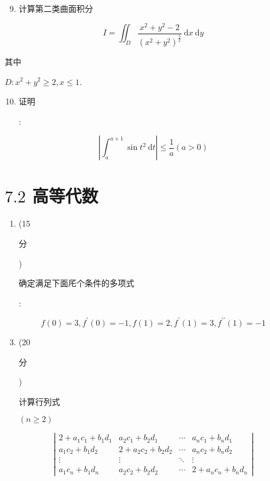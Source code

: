 \documentclass[10pt]{article}
\begin{document}
\begin{enumerate}
  \setcounter{enumi}{8}
  \item \begin{CJK}{UTF8}{mj}计算第二类曲面积分\end{CJK}
\end{enumerate}
$$
I=\iint_{D} \frac{x^{2}+y^{2}-2}{\left(x^{2}+y^{2}\right)^{\frac{5}{2}}} \mathrm{~d} x \mathrm{~d} y
$$
\begin{CJK}{UTF8}{mj}其中\end{CJK} $D: x^{2}+y^{2} \geq 2, x \leq 1$.

\begin{enumerate}
  \setcounter{enumi}{9}
  \item \begin{CJK}{UTF8}{mj}证明\end{CJK}:
\end{enumerate}
$$
\left|\int_{a}^{a+1} \sin t^{2} \mathrm{~d} t\right| \leq \frac{1}{a}(a>0)
$$

\section{$7.2$ 高等代数}
\begin{enumerate}
  \item (15 \begin{CJK}{UTF8}{mj}分\end{CJK}) \begin{CJK}{UTF8}{mj}确定满足下面厇个条件的多项式\end{CJK}:
\end{enumerate}
$$
f(0)=3, f^{\prime}(0)=-1, f(1)=2, f^{\prime}(1)=3, f^{\prime \prime}(1)=-1
$$

\begin{enumerate}
  \setcounter{enumi}{2}
  \item (20 \begin{CJK}{UTF8}{mj}分\end{CJK}) \begin{CJK}{UTF8}{mj}计算行列式\end{CJK} $(n \geqslant 2)$
\end{enumerate}
$$
\left|\begin{array}{cccc}
2+a_{1} c_{1}+b_{1} d_{1} & a_{2} c_{1}+b_{2} d_{1} & \cdots & a_{n} c_{1}+b_{n} d_{1} \\
a_{1} c_{2}+b_{1} d_{2} & 2+a_{2} c_{2}+b_{2} d_{2} & \cdots & a_{n} c_{2}+b_{n} d_{2} \\
\vdots & \vdots & \ddots & \vdots \\
a_{1} c_{n}+b_{1} d_{n} & a_{2} c_{2}+b_{2} d_{2} & \cdots & 2+a_{n} c_{n}+b_{n} d_{n}
\end{array}\right|
$$
\end{document}
